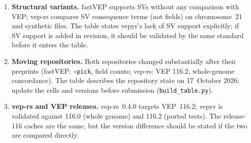 \documentclass[11pt]{article}
\begin{document}
\begin{enumerate}
  same strict md5 comparison would close that gap, before submission or in
  revision.
\item \textbf{Structural variants.} fastVEP supports SVs without any
  comparison with VEP; vep-rs compares SV consequence terms (not fields) on
  chromosome~21 and synthetic files. The table states vepyr's lack of SV
  support explicitly; if SV support is added in revision, it should be
  validated by the same standard before it enters the table.
\item \textbf{Moving repositories.} Both repositories changed substantially
  after their preprints (fastVEP: \texttt{--pick}, field counts; vep-rs: VEP
  116.2, whole-genome concordance). The table describes the repository state
  on 17~October 2026; update the cells and versions before submission
  (\texttt{build\_table.py}).
\item \textbf{vep-rs and VEP releases.} vep-rs~0.4.0 targets VEP~116.2;
  vepyr is validated against 116.0 (whole genome) and 116.2 (ported tests).
  The release-116 caches are the same, but the version difference should be
  stated if the two are compared directly.
\end{enumerate}
\end{document}
